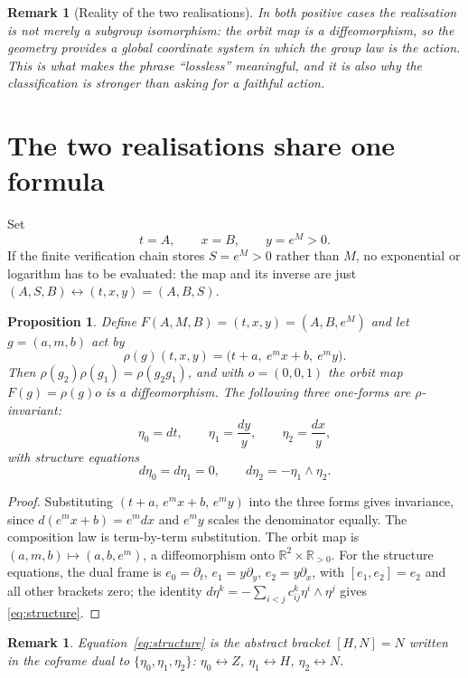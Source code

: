 \documentclass[11pt]{article}
\newtheorem{proposition}[theorem]{Proposition}
\newtheorem{remark}[theorem]{Remark}
\begin{document}
\begin{remark}[Reality of the two realisations]
In both positive cases the realisation is not merely a subgroup isomorphism: the
orbit map is a diffeomorphism, so the geometry provides a global coordinate
system in which the group law is the action. This is what makes the phrase
``lossless'' meaningful, and it is also why the classification is stronger than
asking for a faithful action.
\end{remark}

\section{The two realisations share one formula}
\label{sec:two}

Set
\[
t=A,\qquad x=B,\qquad y=e^M>0 .
\]
If the finite verification chain stores $S=e^M>0$ rather than $M$, no
exponential or logarithm has to be evaluated: the map and its inverse are just
$(A,S,B)\leftrightarrow(t,x,y)=(A,B,S)$.

\begin{proposition}
\label{prop:realisation}
Define $F(A,M,B)=(t,x,y)=(A,B,e^M)$ and let $g=(a,m,b)$ act by
\[
\rho(g)(t,x,y)=\bigl(t+a,\ e^mx+b,\ e^my\bigr).
\]
Then $\rho(g_2)\rho(g_1)=\rho(g_2g_1)$, and with $o=(0,0,1)$ the orbit map
$F(g)=\rho(g)o$ is a diffeomorphism. The following three one-forms are
$\rho$-invariant:
\[
\eta_0=dt,\qquad \eta_1=\frac{dy}{y},\qquad \eta_2=\frac{dx}{y},
\]
with structure equations
\begin{equation}
\label{eq:structure}
d\eta_0=d\eta_1=0,\qquad d\eta_2=-\eta_1\wedge\eta_2 .
\end{equation}
\end{proposition}

\begin{proof}
Substituting $(t+a,\,e^mx+b,\,e^my)$ into the three forms gives invariance, since
$d(e^mx+b)=e^mdx$ and $e^my$ scales the denominator equally. The composition law
is term-by-term substitution. The orbit map is $(a,m,b)\mapsto(a,b,e^m)$, a
diffeomorphism onto $\mathbb R^2\times\mathbb R_{>0}$. For the structure
equations, the dual frame is $e_0=\partial_t$, $e_1=y\partial_y$, $e_2=y\partial_x$,
with $[e_1,e_2]=e_2$ and all other brackets zero; the identity
$d\eta^k=-\sum_{i<j}c^k_{ij}\eta^i\wedge\eta^j$ gives \eqref{eq:structure}.
\end{proof}

\begin{remark}
Equation~\eqref{eq:structure} is the abstract bracket $[H,N]=N$ written in the
coframe dual to $\{\eta_0,\eta_1,\eta_2\}$: $\eta_0\leftrightarrow Z$,
$\eta_1\leftrightarrow H$, $\eta_2\leftrightarrow N$.
\end{remark}
\end{document}
